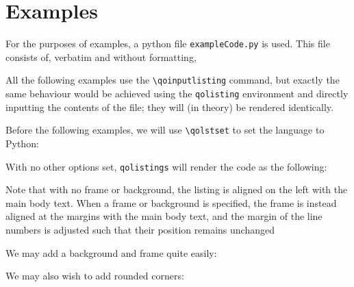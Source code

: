 \documentclass{article}
\newcommand{\ttt}[1]{\texttt{#1}}
\begin{document}
\section{Examples}

For the purposes of examples, a python file \ttt{exampleCode.py} is used. This file consists of, verbatim and without formatting,
\begin{mdframed}\leavevmode
    
\end{mdframed}

All the following examples use the \verb|\qoinputlisting| command, but exactly the same behaviour would be achieved using the \verb|qolisting| environment and directly inputting the contents of the file; they will (in theory) be rendered identically.

Before the following examples, we will use \verb|\qolstset| to set the language to Python:
\begin{qolisting}[lst options = {language = {[LaTeX]TeX}}, frame, background]
\end{qolisting}

\clearpage

With no other options set, \ttt{qolistings} will render the code as the following:
\begin{qolisting}[lst options = {language = {[LaTeX]TeX}}, frame, background]
\end{qolisting}

Note that with no frame or background, the listing is aligned on the left with the main body text. When a frame or background is specified, the frame is instead aligned at the margins with the main body text, and the margin of the line numbers is adjusted such that their position remains unchanged

We may add a background and frame quite easily:
\begin{qolisting}[lst options = {language = {[LaTeX]TeX}}, frame, background]
\end{qolisting}

\clearpage

We may also wish to add rounded corners:
\begin{qolisting}[lst options = {language = {[LaTeX]TeX}}, frame, background]
\end{qolisting}
\end{document}
